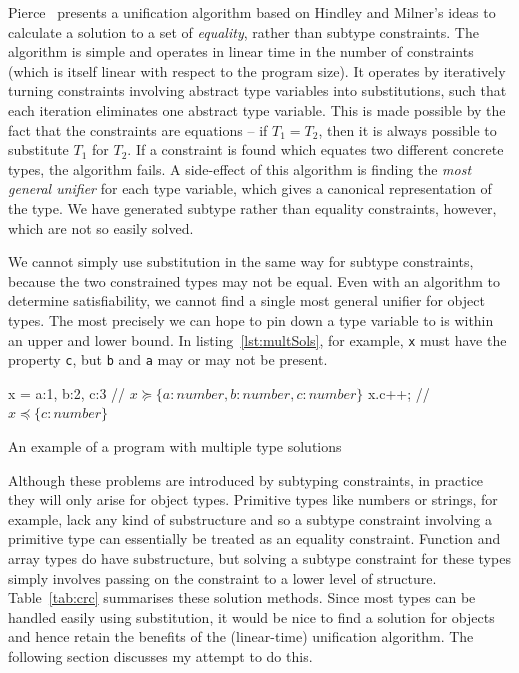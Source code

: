 \documentclass[12pt,a4paper,twoside,openright]{report}
\theoremstyle{definition}
\theoremstyle{dotless}
\newcommand*{\js}{\texttt}
\begin{document}
Pierce~\cite{pierce} presents a unification algorithm based on Hindley and
Milner's ideas to calculate a solution to a set of \textit{equality}, rather
than subtype constraints. The algorithm is simple and operates in linear time
in the number of constraints (which is itself linear with respect to the
program size). It operates by iteratively turning constraints involving
abstract type variables into substitutions, such that each iteration eliminates
one abstract type variable.  This is made possible by the fact that the
constraints are equations -- if $T_1=T_2$, then it is always possible to
substitute $T_1$ for $T_2$. If a constraint is found which equates two
different concrete types, the algorithm fails. A side-effect of this algorithm
is finding the \textit{most general unifier} for each type variable, which
gives a canonical representation of the type.  We have generated subtype rather
than equality constraints, however, which are not so easily solved.

We cannot simply use substitution in the same way for subtype constraints,
because the two constrained types may not be equal. Even with an algorithm to
determine satisfiability, we cannot find a single most general unifier for
object types.  The most precisely we can hope to pin down a type variable to is
within an upper and lower bound.  In listing~\ref{lst:multSols}, for example,
\js{x} must have the property \js{c}, but \js{b} and \js{a} may or may not be
present.  


\begin{listing}[h]
  \begin{jscript}
	x = {a:1, b:2, c:3} // $x \succeq \{a:number, b:number, c:number\}$
	x.c++;              // $x \preceq \{c:number\}$
  \end{jscript}
  \caption{An example of a program with multiple type solutions}\label{lst:multSols}
\end{listing}

Although these problems are introduced by subtyping constraints, in practice
they will only arise for object types. Primitive types like numbers or strings,
for example, lack any kind of substructure and so a subtype constraint
involving a primitive type can essentially be treated as an equality
constraint. Function and array types do have substructure, but solving a
subtype constraint for these types simply involves passing on the constraint to
a lower level of structure. Table~\ref{tab:crc} summarises these solution
methods. Since most types can be handled easily using substitution, it would be
nice to find a solution for objects and hence retain the benefits of the
(linear-time) unification algorithm. The following section discusses my attempt
to do this.
\end{document}
